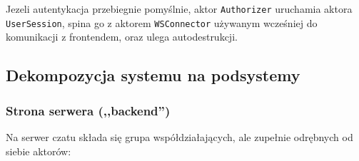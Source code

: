 Jezeli autentykacja przebiegnie pomyślnie, aktor \texttt{Authorizer} uruchamia aktora \texttt{UserSession}, spina go z aktorem \texttt{WSConnector} używanym wcześniej do komunikacji z frontendem, oraz ulega autodestrukcji.

\subsection{Dekompozycja systemu na podsystemy}
\label{architektura_chatu}

\subsubsection{Strona serwera (,,backend'')}
Na serwer czatu składa się grupa współdziałających, ale zupełnie odrębnych od
siebie aktorów:

